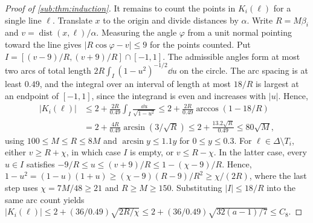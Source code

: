 \documentclass[11pt,letterpaper]{article}
\DeclareMathOperator{\dist}{dist}
\begin{document}
\begin{proof}[Proof of \cref{sub:thm:induction}]
It remains to count the points in $K_i(\ell)$ for a single line $\ell$. Translate $x$ to the origin and divide distances by $\alpha$. Write $R=M\beta_i$ and $v=\dist(x,\ell)/\alpha$. Measuring the angle $\varphi$ from a unit normal pointing toward the line gives $\lvert R\cos\varphi-v\rvert\le9$ for the points counted. Put $I=[(v-9)/R,(v+9)/R]\cap[-1,1]$. The admissible angles form at most two arcs of total length $2R\int_I(1-u^2)^{-1/2}\dd u$ on the circle. The arc spacing is at least $0.49$, and the integral over an interval of length at most $18/R$ is largest at an endpoint of $[-1,1]$, since the integrand is even and increases with $\lvert u\rvert$. Hence,
\begin{align*}
 \lvert K_i(\ell)\rvert
 &\le 2+\frac{2R}{0.49}\int_I\frac{\dd u}{\sqrt{1-u^2}}
 \le 2+\frac{2R}{0.49}\arccos(1-18/R)\\
 &=2+\frac{4R}{0.49}\arcsin(3/\sqrt R)
 \le 2+\frac{13.2\sqrt R}{0.49}
 \le 80\sqrt M,
\end{align*}
using $100\le M\le R\le8M$ and $\arcsin y\le1.1y$ for $0\le y\le0.3$. For $\ell\in\Delta\setminus T_i$, either $v\ge R+\chi$, in which case $I$ is empty, or $v\le R-\chi$. In the latter case, every $u\in I$ satisfies $-9/R\le u\le(v+9)/R\le1-(\chi-9)/R$. Hence, $1-u^2=(1-u)(1+u)\ge(\chi-9)(R-9)/R^2\ge\chi/(2R)$, where the last step uses $\chi=7M/48\ge21$ and $R\ge M\ge150$. Substituting $\lvert I\rvert\le18/R$ into the same arc count yields $\lvert K_i(\ell)\rvert\le2+(36/0.49)\sqrt{2R/\chi}\le2+(36/0.49)\sqrt{32(a-1)/7}\le C_8$.
\end{proof}

\end{document}
